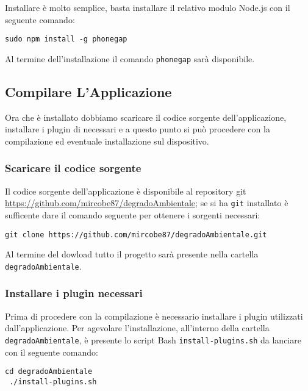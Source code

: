         Installare \pg{} è molto semplice, basta installare il relativo modulo 
        Node.js con il seguente comando:
        \begin{lstlisting}[language=plane]
 sudo npm install -g phonegap
        \end{lstlisting}
        Al termine dell'installazione il comando \texttt{phonegap} sarà 
        disponibile.
        
    \subsection{Compilare L'Applicazione}
        Ora che \pg{} è installato dobbiamo scaricare il codice sorgente 
        dell'applicazione, installare i plugin di \pg{} necessari e a questo 
        punto si può procedere con la compilazione ed eventuale installazione 
        sul dispositivo.
        
        \subsubsection{Scaricare il codice sorgente}
            Il codice sorgente dell'applicazione \pg{} è disponibile al 
            repository git 
            \url{https://github.com/mircobe87/degradoAmbientale}; se si ha 
            \texttt{git} installato è sufficente dare il comando seguente per 
            ottenere i sorgenti necessari:
            \begin{lstlisting}[language=plane]
 git clone https://github.com/mircobe87/degradoAmbientale.git
            \end{lstlisting}
            Al termine del dowload tutto il progetto sarà presente nella 
            cartella \texttt{degradoAmbientale}.
            
        \subsubsection{Installare i plugin necessari}
            Prima di procedere con la compilazione è necessario installare i 
            plugin utilizzati dall'applicazione. Per agevolare 
            l'installazione, all'interno della cartella 
            \texttt{degradoAmbientale}, è presente lo script Bash 
            \texttt{install-plugins.sh} da lanciare con il seguente comando:
            \begin{lstlisting}[language=plane]
 cd degradoAmbientale
 ./install-plugins.sh
            \end{lstlisting}
            
